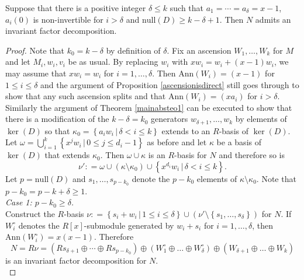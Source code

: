 \begin{theorem}  \label{mainabsteo2}  Suppose that there  is  a positive integer  $ \delta   \leq  k    $ such that $ a_{1} = \cdots = a_{\delta} = x-1 $, $ a_{i}(0) $ is non-invertible for $ i > \delta $     and $  \mathrm{null}   (D) \geq k - \delta + 1 $.    Then $ N $ admits an invariant  factor   decomposition.    
\end{theorem}    

\begin{proof} Note that $k_0 = k - \delta$ by definition of $\delta$. Fix an ascension $ W_{1}, \ldots, W_{k} $ for $ M $ and let $ M_{i}, w_{i}, v_{i} $ be as  usual.  By replacing $ w_{i} $ with $ x w_{i} = w_{i} + (x-1)w_{i}  $, we may assume that $ x w_{i} = w_{i}  $ for $ i = 1, \ldots, \delta $. Then $ \mathrm{Ann}(W_{i}) = (x-1) $ for $1 \leq  i \leq \delta $ and the argument of Proposition \ref{ascensionisdirect} still goes through  to show that any such  ascension   splits and that $ \mathrm{Ann}(W_{i}) = ( x a_{i} ) $ for $ i > \delta $.   Similarly the argument of Theorem \ref{mainabsteo1} can be executed to show that there is a modification of  the $   k - \delta  =  k_{0}     $ generators $ w_{\delta+1} , \ldots, w_{k} $ by elements of $ \ker(D) $ so that  $ \kappa_{0}  =  \left \{ a_{i} w_{i} \, | \, \delta < i \leq k \right \} $ extends to an $R $-basis of $ \ker(D) $. Let $  \omega  = \bigcup_{i=1}^{k} \left \{  x^{j}   w_{i} \, | \, 0 \leq j \leq d_{i} - 1  \right \}  $ as before and let $ \kappa  $  be  a   basis of $ \ker (D ) $ that extends $ \kappa_{0} $. Then $ \omega \cup  \kappa $ is an $ R $-basis for $ N $ and therefore so is $$ \nu '    : = \omega   \cup ( \kappa \setminus \kappa_{0  } )  \cup \left \{ x^{d_{i}    }  w_{i} \, | \, \delta < i \leq k \right \} . $$   Let $ p  =  \mathrm{null} (D)   $ and  $ s_{1}, \ldots, s_{p-k_{0}} $ denote the $ p - k_{0} $  elements of $ \kappa \setminus \kappa_{0} $. Note that $ p - k_{0} = p - k + \delta \geq 1 $. \\

\textit{Case 1: $ p - k_{0} \geq \delta $.} \\

 Construct the $ R $-basis $ \nu : = \left \{  s_{i} +  w_{i} \,  | \,  1 \leq i \leq \delta    \right \} \cup ( \nu' \setminus \left \{  s_{1}, \ldots, s_{\delta} \right \}   )   $ for $ N $. If $ W_{i}^{\circ} $ denotes the $ R[x] $-submodule generated by $ w_{i} + s_{i} $ for $ i = 1 , \ldots, \delta $, then $ \mathrm{Ann}(W_{i}^{\circ}) = x(x-1) $. Therefore  
 $$ N = R \nu =  \left (    R s_{\delta + 1 } \oplus \cdots \oplus R s_{p-k_{0}}  \right   ) \oplus \left (   W_{1}^{\circ} \oplus \ldots  \oplus  W_{\delta}^{\circ}  \right ) \oplus \left ( W_{\delta + 1 } \oplus \ldots      \oplus W_{k} \right )   $$
is an invariant factor decomposition for  $ N $. \\


\end{proof}
